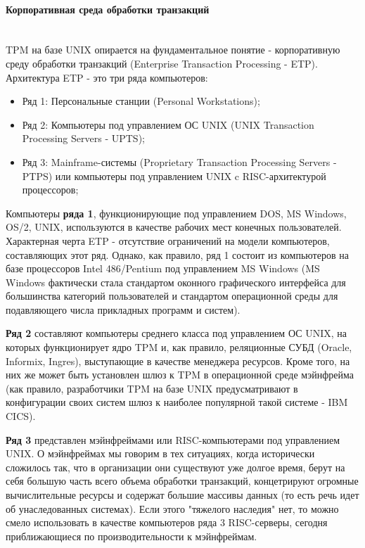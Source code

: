 \paragraph{Корпоративная среда обработки транзакций}~\\

TPM на базе UNIX опирается на фундаментальное понятие - корпоративную среду обработки транзакций
(Enterprise Transaction Processing - ETP). Архитектура ETP - это три ряда компьютеров:
\begin{itemize}
    \item Ряд 1: Персональные станции (Personal Workstations);
    \item Ряд 2: Компьютеры под управлением ОС UNIX (UNIX Transaction Processing Servers - UPTS);
    \item Ряд 3: Mainframe-системы (Proprietary Transaction Processing Servers - PTPS) или компьютеры под управлением UNIX c RISC-архитектурой процессоров;
\end{itemize}

Компьютеры \textbf{ряда 1}, функционирующие под управлением DOS, MS Windows, OS/2, UNIX, используются в качестве рабочих мест
конечных пользователей. Характерная черта ETP - отсутствие ограничений на модели компьютеров,
составляющих этот ряд. Однако, как правило, ряд 1 состоит из компьютеров на базе процессоров Intel
486/Pentium под управлением MS Windows (MS Windows фактически стала стандартом оконного графического интерфейса
для большинства категорий пользователей и стандартом операционной среды для подавляющего числа прикладных программ и систем).

\textbf{Ряд 2} составляют компьютеры среднего класса под управлением ОС UNIX,
на которых функционирует ядро TPM и, как правило, реляционные СУБД (Oracle, Informix, Ingres),
выступающие в качестве менеджера ресурсов. Кроме того, на них же может быть установлен шлюз к TPM в
операционной среде мэйнфрейма (как правило, разработчики TPM на базе UNIX предусматривают в конфигурации своих
систем шлюз к наиболее популярной такой системе - IBM CICS).

\textbf{Ряд 3} представлен мэйнфреймами или RISC-компьютерами под управлением UNIX. О мэйнфреймах мы
говорим в тех ситуациях, когда исторически сложилось так, что в организации они существуют уже долгое время,
берут на себя большую часть всего объема обработки транзакций, концетрируют огромные вычислительные
ресурсы и содержат большие массивы данных (то есть речь идет об унаследованных системах). Если этого
"тяжелого наследия" нет, то можно смело использовать в качестве компьютеров ряда 3 RISC-серверы,
сегодня приближающиеся по производительности к мэйнфреймам.

